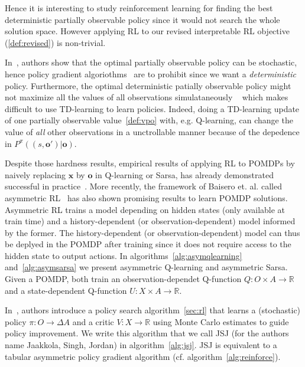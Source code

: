 Hence it is interesting to study reinforcement learning for finding the best deterministic partially observable policy since it would not search the whole solution space.
However applying RL to our revised interpretable RL objective (\ref{def:revised}) is non-trivial.

In~\cite[Fact 2]{learning-pomdp}, authors show that the optimal partially observable policy can be stochastic, hence policy gradient algoriothms~\cite{pg_sutton} are to prohibit since we want a \textit{deterministic} policy. 
Furthermore, the optimal deterministic patially observable policy might not maximize all the values of all observations simulataneously ~\cite[Fact 5]{learning-pomdp} which makes difficult to use TD-learning to learn policies.
Indeed, doing a TD-learning update of one partially observable value~\ref{def:vpo} with, e.g. Q-learning, can change the value of \textit{all} other observations in a unctrollable manner because of the depedence in $P^{\pi}((s, \boldsymbol{o}')|\boldsymbol{o})$.

Despite those hardness results, empirical results of applying RL to POMDPs by naively replacing $\boldsymbol{x}$ by $\boldsymbol{o}$ in Q-learning or Sarsa, has already demonstrated successful in practice~\cite{sarsa-pomdp}. 
More recently, the framework of Baisero et. al. called asymmetric RL~\cite{baisero-dqn,baisero-ppo} has also shown promising results to learn POMDP solutions.
Asymmetric RL trains a model depending on hidden states (only available at train time) and a history-dependent (or observation-dependent) model informed by the former.
The history-dependent (or observation-dependent) model can thus be deplyed in the POMDP after training since it does not require access to the hidden state to output actions.
In algorithms~\ref{alg:asymqlearning} and~\ref{alg:asymsarsa} we present asymmetric Q-learning and asymmetric Sarsa. Given a POMDP, both train an observation-dependet Q-function $Q:O\times A\rightarrow\mathbb{R}$ and a state-dependent Q-function $U:X\times A\rightarrow\mathbb{R}$.

In~\cite{jsj}, authors introduce a policy search algorithm~\ref{sec:rl} that learns a (stochastic) policy $\pi:O\rightarrow\Delta A$ and a critic $V:X\rightarrow \mathbb{R}$ using Monte Carlo estimates to guide policy improvement.
We write this algorithm that we call JSJ (for the authors name Jaakkola, Singh, Jordan) in algorithm~\ref{alg:jsj}. JSJ is equivalent to a tabular asymmetric policy gradient algorithm (cf. algorithm~\ref{alg:reinforce}). 

